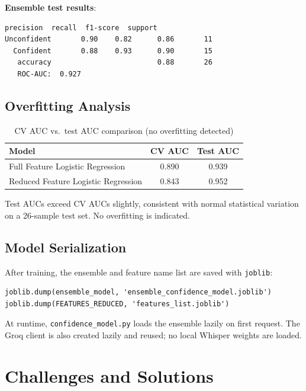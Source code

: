 \documentclass[12pt,a4paper]{article}
\begin{document}
\textbf{Ensemble test results}:
\begin{lstlisting}[numbers=none]
              precision  recall  f1-score  support
Unconfident       0.90    0.82      0.86       11
  Confident       0.88    0.93      0.90       15
   accuracy                         0.88       26
   ROC-AUC:  0.927
\end{lstlisting}

\subsection{Overfitting Analysis}

\begin{table}[H]
\centering
\caption{CV AUC vs.\ test AUC comparison (no overfitting detected)}
\small
\begin{tabular}{l c c}
\toprule
\textbf{Model} & \textbf{CV AUC} & \textbf{Test AUC} \\
\midrule
Full Feature Logistic Regression & 0.890 & 0.939 \\
Reduced Feature Logistic Regression & 0.843 & 0.952 \\
\bottomrule
\end{tabular}
\end{table}

Test AUCs exceed CV AUCs slightly, consistent with normal statistical variation on a 26-sample test set. No overfitting is indicated.

\subsection{Model Serialization}

After training, the ensemble and feature name list are saved with \texttt{joblib}:

\begin{lstlisting}[style=python, numbers=none]
joblib.dump(ensemble_model, 'ensemble_confidence_model.joblib')
joblib.dump(FEATURES_REDUCED, 'features_list.joblib')
\end{lstlisting}

At runtime, \texttt{confidence\_model.py} loads the ensemble lazily on first request. The Groq client is also created lazily and reused; no local Whisper weights are loaded.

\section{Challenges and Solutions}
\end{document}

